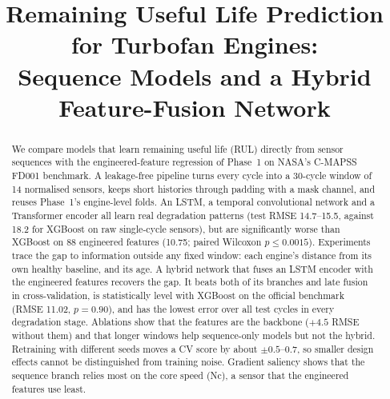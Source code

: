 \documentclass[conference]{IEEEtran}
\begin{document}
\title{Remaining Useful Life Prediction for Turbofan Engines:\\
Sequence Models and a Hybrid Feature-Fusion Network}

\author{
\and
{}
\and
{}
\and
{}
\and
{}
\and
{}
}

\maketitle

\begin{abstract}
We compare models that learn remaining useful life (RUL) directly from sensor sequences with the engineered-feature regression of Phase~1 on NASA's C-MAPSS FD001 benchmark. A leakage-free pipeline turns every cycle into a 30-cycle window of 14 normalised sensors, keeps short histories through padding with a mask channel, and reuses Phase~1's engine-level folds. An LSTM, a temporal convolutional network and a Transformer encoder all learn real degradation patterns (test RMSE 14.7--15.5, against 18.2 for XGBoost on raw single-cycle sensors), but are significantly worse than XGBoost on 88 engineered features (10.75; paired Wilcoxon $p\leq0.0015$). Experiments trace the gap to information outside any fixed window: each engine's distance from its own healthy baseline, and its age. A hybrid network that fuses an LSTM encoder with the engineered features recovers the gap. It beats both of its branches and late fusion in cross-validation, is statistically level with XGBoost on the official benchmark (RMSE 11.02, $p=0.90$), and has the lowest error over all test cycles in every degradation stage. Ablations show that the features are the backbone ($+4.5$ RMSE without them) and that longer windows help sequence-only models but not the hybrid. Retraining with different seeds moves a CV score by about $\pm0.5$--$0.7$, so smaller design effects cannot be distinguished from training noise. Gradient saliency shows that the sequence branch relies most on the core speed (Nc), a sensor that the engineered features use least.
\end{abstract}
\end{document}
